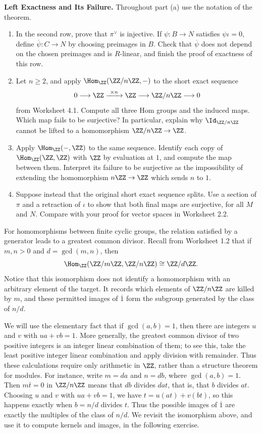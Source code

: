 \documentclass[12pt,reqno]{amsart}
\begin{document}
\hrulefill

\begin{problems}
\item\label{h:left-exact} \textbf{Left Exactness and Its Failure.} Throughout part (a) use the notation of the theorem.
\begin{enumerate}
\item In the second row, prove that $\pi^{\vee}$ is injective. If $\psi:B\to N$ satisfies $\psi\iota=0$, define $\overline\psi:C\to N$ by choosing preimages in $B$. Check that $\overline\psi$ does not depend on the chosen preimages and is $R$-linear, and finish the proof of exactness of this row.
\item Let $n\geq2$, and apply $\Hom_{\ZZ}(\ZZ/n\ZZ,-)$ to the short exact sequence
\[
0\longrightarrow\ZZ\xrightarrow{\ \times n\ }\ZZ\longrightarrow\ZZ/n\ZZ\longrightarrow0
\]
from Worksheet 4.1. Compute all three Hom groups and the induced maps. Which map fails to be surjective? In particular, explain why $\Id_{\ZZ/n\ZZ}$ cannot be lifted to a homomorphism $\ZZ/n\ZZ\to\ZZ$.
\item Apply $\Hom_{\ZZ}(-,\ZZ)$ to the same sequence. Identify each copy of $\Hom_{\ZZ}(\ZZ,\ZZ)$ with $\ZZ$ by evaluation at $1$, and compute the map between them. Interpret its failure to be surjective as the impossibility of extending the homomorphism $n\ZZ\to\ZZ$ which sends $n$ to $1$.
\item Suppose instead that the original short exact sequence splits. Use a section of $\pi$ and a retraction of $\iota$ to show that both final maps are surjective, for all $M$ and $N$. Compare with your proof for vector spaces in Worksheet 2.2.
\end{enumerate}
\end{problems}

\hrulefill

For homomorphisms between finite cyclic groups, the relation satisfied by a generator leads to a greatest common divisor. Recall from Worksheet 1.2 that if $m,n>0$ and $d=\gcd(m,n)$, then
\[
\Hom_{\ZZ}(\ZZ/m\ZZ,\ZZ/n\ZZ)\cong\ZZ/d\ZZ.
\]
Notice that this isomorphism does not identify a homomorphism with an arbitrary element of the target. It records which elements of $\ZZ/n\ZZ$ are killed by $m$, and these permitted images of $\overline1$ form the subgroup generated by the class of $n/d$.

We will use the elementary fact that if $\gcd(a,b)=1$, then there are integers $u$ and $v$ with $ua+vb=1$. More generally, the greatest common divisor of two positive integers is an integer linear combination of them; to see this, take the least positive integer linear combination and apply division with remainder. Thus these calculations require only arithmetic in $\ZZ$, rather than a structure theorem for modules. For instance, write $m=da$ and $n=db$, where $\gcd(a,b)=1$. Then $m\overline t=0$ in $\ZZ/n\ZZ$ means that $db$ divides $dat$, that is, that $b$ divides $at$. Choosing $u$ and $v$ with $ua+vb=1$, we have $t=u(at)+v(bt)$, so this happens exactly when $b=n/d$ divides $t$. Thus the possible images of $\overline1$ are exactly the multiples of the class of $n/d$. We revisit the isomorphism above, and use it to compute kernels and images, in the following exercise.
\end{document}
